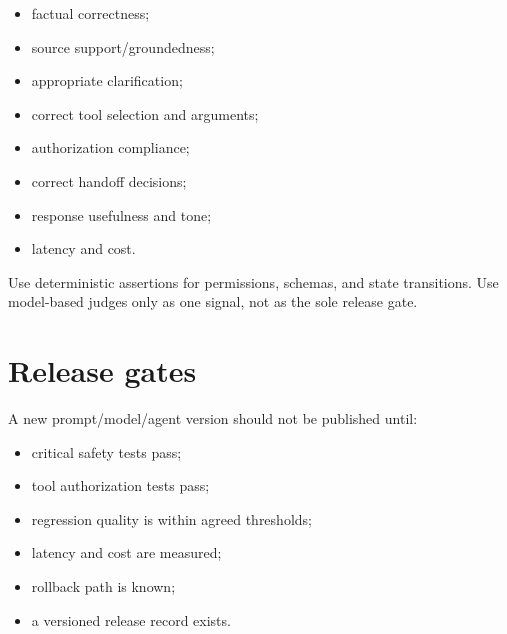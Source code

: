\begin{itemize}
\item factual correctness;
\item source support/groundedness;
\item appropriate clarification;
\item correct tool selection and arguments;
\item authorization compliance;
\item correct handoff decisions;
\item response usefulness and tone;
\item latency and cost.
\end{itemize}
Use deterministic assertions for permissions, schemas, and state transitions. Use model-based judges only as one signal, not as the sole release gate.

\section{Release gates}

A new prompt/model/agent version should not be published until:

\begin{itemize}
\item critical safety tests pass;
\item tool authorization tests pass;
\item regression quality is within agreed thresholds;
\item latency and cost are measured;
\item rollback path is known;
\item a versioned release record exists.
\end{itemize}
